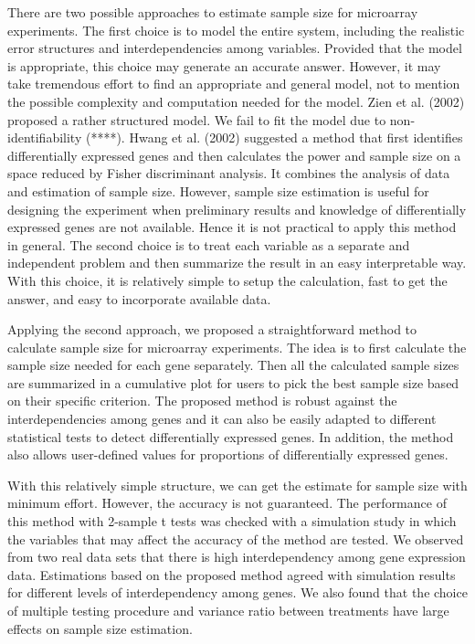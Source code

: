 \documentclass{bioinfo}
\begin{document}
There are two possible approaches to estimate sample size for microarray experiments. The first choice is to model the entire
system, including the realistic error structures and interdependencies among variables. Provided that the model is appropriate,
this choice may generate an accurate answer. However, it may take tremendous effort to find an appropriate and general model,
not to mention the possible complexity and computation needed for the model. Zien et al. (2002) proposed a rather structured
model. We fail to fit the model due to non-identifiability (****). Hwang et al. (2002) suggested a method that first identifies
differentially expressed genes and then calculates the power and sample size on a space reduced by Fisher discriminant
analysis. It combines the analysis of data and estimation of sample size. However, sample size estimation is useful for
designing the experiment when preliminary results and knowledge of differentially expressed genes are not available. Hence it
is not practical to apply this method in general. The second choice is to treat each variable as a separate and independent
problem and then summarize the result in an easy interpretable way. With this choice, it is relatively simple to setup the
calculation, fast to get the answer, and easy to incorporate available data.

Applying the second approach, we proposed a straightforward method
to calculate sample size for microarray experiments. The idea is
to first calculate the sample size needed for each gene
separately. Then all the calculated sample sizes are summarized in
a cumulative plot for users to pick the best sample size based on
their specific criterion. The proposed method is robust against
the interdependencies among genes and it can also be easily
adapted to different statistical tests to detect differentially
expressed genes. In addition, the method also allows user-defined
values for proportions of differentially expressed genes.

With this relatively simple structure, we can get the estimate for sample size with minimum effort. However, the accuracy is
not guaranteed. The performance of this method with 2-sample t tests was checked with a simulation study in which the variables
that may affect the accuracy of the method are tested. We observed from two real data sets that there is high interdependency
among gene expression data. Estimations based on the proposed method agreed with simulation results for different levels of
interdependency among genes. We also found that the choice of multiple testing procedure and variance ratio between treatments
have large effects on sample size estimation.
\end{document}
